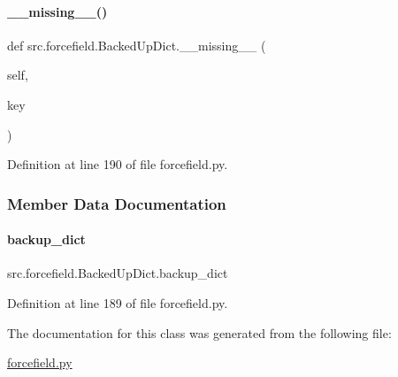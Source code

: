 \paragraph{\texorpdfstring{\+\_\+\+\_\+missing\+\_\+\+\_\+()}{\_\_missing\_\_()}}
{\footnotesize\ttfamily def src.\+forcefield.\+Backed\+Up\+Dict.\+\_\+\+\_\+missing\+\_\+\+\_\+ (\begin{DoxyParamCaption}\item[{}]{self,  }\item[{}]{key }\end{DoxyParamCaption})}



Definition at line 190 of file forcefield.\+py.



\subsubsection{Member Data Documentation}
\mbox{\label{classsrc_1_1forcefield_1_1BackedUpDict_addf8540237840c1a5d7f0b3a58002687}} 
\paragraph{\texorpdfstring{backup\+\_\+dict}{backup\_dict}}
{\footnotesize\ttfamily src.\+forcefield.\+Backed\+Up\+Dict.\+backup\+\_\+dict}



Definition at line 189 of file forcefield.\+py.



The documentation for this class was generated from the following file\+:\begin{DoxyCompactItemize}
\item 
\hyperlink{forcefield_8py}{forcefield.\+py}\end{DoxyCompactItemize}
